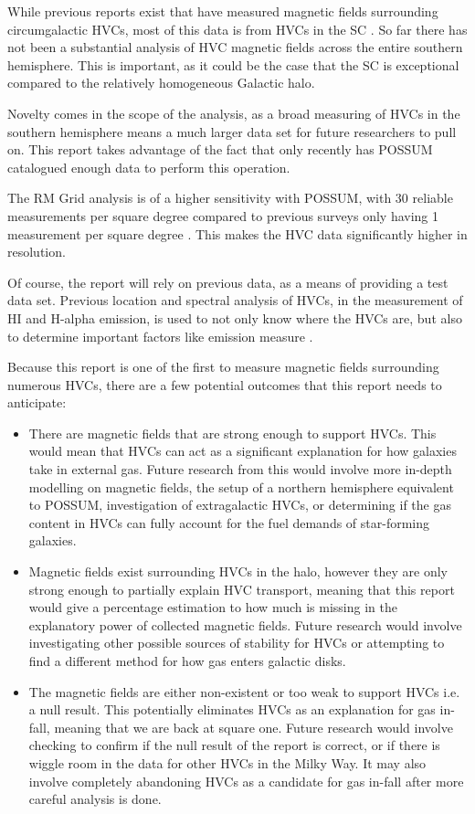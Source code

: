 While previous reports exist that have measured magnetic fields surrounding circumgalactic HVCs, most of this data is from HVCs in the SC \cite{ID2, ID5, ID23, ID26}. So far there has not been a substantial analysis of HVC magnetic fields  across the entire southern hemisphere. This is important, as it could be the case that the SC is exceptional compared to the relatively homogeneous Galactic halo.

Novelty comes in the scope of the analysis, as a broad measuring of HVCs in the southern hemisphere means a much larger data set for future researchers to pull on. This report takes advantage of the fact that only recently has POSSUM catalogued enough data to perform this operation.

The RM Grid analysis is of a higher sensitivity with POSSUM, with 30 reliable measurements per square degree compared to previous surveys only having 1 measurement per square degree \cite{ID18, ID1}. This makes the HVC data significantly higher in resolution.

Of course, the report will rely on previous data, as a means of providing a test data set. Previous location and spectral analysis of HVCs, in the measurement of HI and H-alpha emission, is used to not only know where the HVCs are, but also to determine important factors like emission measure \cite{ID5, ID26, ID30}.

Because this report is one of the first to measure magnetic fields surrounding numerous HVCs, there are a few potential outcomes that this report needs to anticipate:
\begin{itemize}
\item There are magnetic fields that are strong enough to support HVCs. This would mean that HVCs can act as a significant explanation for how galaxies take in external gas. Future research from this would involve more in-depth modelling on magnetic fields, the setup of a northern hemisphere equivalent to POSSUM, investigation of extragalactic HVCs, or determining if the gas content in HVCs can fully account for the fuel demands of star-forming galaxies.
\item Magnetic fields exist surrounding HVCs in the halo, however they are only strong enough to partially explain HVC transport, meaning that this report would give a percentage estimation to how much is missing in the explanatory power of collected magnetic fields. Future research would involve investigating other possible sources of stability for HVCs or attempting to find a different method for how gas enters galactic disks.
\item The magnetic fields are either non-existent or too weak to support HVCs i.e. a null result. This potentially eliminates HVCs as an explanation for gas in-fall, meaning that we are back at square one. Future research would involve checking to confirm if the null result of the report is correct, or if there is wiggle room in the data for other HVCs in the Milky Way. It may also involve completely abandoning HVCs as a candidate for gas in-fall after more careful analysis is done.
\end{itemize}